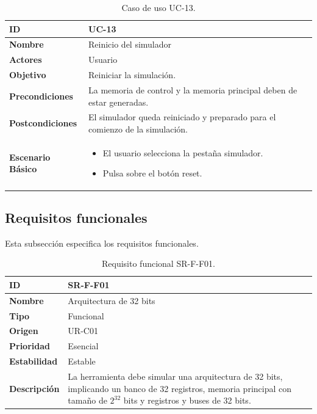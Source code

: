 \begin{center}
\begin{table}[htbp]
\centering
\caption{Caso de uso UC-13.}
\begin{tabular}{@{}p{2.5cm} p{9cm}@{}} 
\toprule
\textbf{ID}	& UC-13  \\
\midrule
\textbf{Nombre} 		& Reinicio del simulador  \\
\midrule
\textbf{Actores} 		&	Usuario  \\
\midrule
\textbf{Objetivo} 	&	Reiniciar la simulación.	 \\
\midrule
\textbf{Precondiciones}	&	La memoria de control y la memoria principal deben de estar generadas.  \\
\midrule
\textbf{Postcondiciones} 	& El simulador queda reiniciado y preparado para el comienzo de la simulación.   \\
\midrule
\textbf{Escenario Básico} 	&  \begin{itemize}
\item El usuario selecciona la pestaña simulador.
\item Pulsa sobre el botón reset.
\end{itemize} \\
\bottomrule
\end{tabular}
\label{tab:uc13}
\end{table}
\end{center}


\clearpage
\subsection{Requisitos funcionales}

Esta subsección especifica los requisitos funcionales.

\begin{center}
\begin{table}[htbp]
\centering
\caption{Requisito funcional SR-F-F01.}
\begin{tabular}{@{}p{2.5cm} p{9cm}@{}} 
\toprule
\textbf{ID} 				& SR-F-F01 \\
\midrule
\textbf{Nombre} 			& Arquitectura de 32 bits \\
\midrule
\textbf{Tipo} 			& Funcional \\
\midrule
\textbf{Origen} 			& UR-C01 \\
\midrule
\textbf{Prioridad}		& Esencial \\
\midrule
\textbf{Estabilidad} 		& Estable \\
\midrule
\textbf{Descripción} 	& La herramienta debe simular una arquitectura de 32 bits, implicando un banco de 32 registros, memoria principal con tamaño de  $2^{32}$ bits y registros y buses de 32 bits. \\
\bottomrule
\end{tabular}
\label{tab:srff01}
\end{table}
\end{center}


